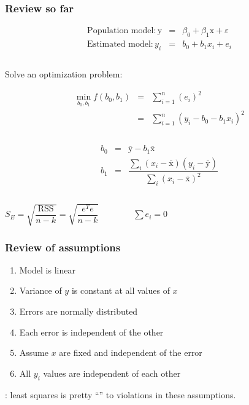 \begin{frame}\frametitle{Review so far}

	$$
	\begin{array}{rcl}
		\text{Population model}: \mathrm{y} &=& \beta_0 + \beta_1 \mathrm{x} + \varepsilon \\
		\text{Estimated model}: y_i &=& b_0 + b_1 x_i + e_i \\
		\\
	\end{array}
	$$

	Solve an optimization problem:

	$$
	\begin{array}{rcl}
		\min_{\displaystyle b_0, b_1} f(b_0, b_1) &=& \sum_{i=1}^{n}{(e_i)^2} \\
		&=& \sum_{i=1}^{n}{\left(y_i - b_0 - b_1 x_i\right)^2} \\
		\\
	\end{array}
	$$

	$$
	\begin{array}{rcl}
		b_0 &=& \overline{\mathrm{y}} - b_1\overline{\mathrm{x}} \\
		b_1 &=& \dfrac{ \sum_i{\left(x_i - \overline{\mathrm{x}}\right)\left(y_i - \overline{\mathrm{y}}\right) } }{ \sum_i{\left( x_i - \overline{\mathrm{x}}\right)^2} } \\
		\\
	\end{array}
	$$
	
	
	$S_E = \sqrt{\dfrac{\text{RSS}}{n-k}} = \sqrt{\dfrac{ e^Te}{n-k}} \qquad\qquad \sum{e_i}=0$
	
\end{frame}

\begin{frame}\frametitle{Review of assumptions}
	\begin{enumerate}
		\item	Model is linear
		\item	Variance of $y$ is constant at all values of $x$
		\item	Errors are normally distributed
		\item	Each error is independent of the other
		\item	Assume $x$ are fixed and independent of the error
		\item	All $y_i$ values are independent of each other
	\end{enumerate}
	\vspace{12pt}
	{\color{myGreen}{Fortunately}}: least squares is pretty ``{\color{purple}{robust}}'' to violations in these assumptions.
\end{frame}


